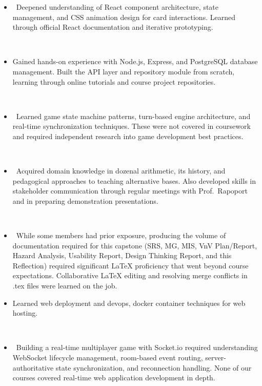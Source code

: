 \documentclass{article}
\begin{document}
\begin{itemize}
  \item  Deepened understanding of React component architecture, state management, and CSS animation design for card interactions. Learned through official React documentation and iterative prototyping.

  \item Gained hands-on experience with Node.js, Express, and PostgreSQL database management. Built the API layer and repository module from scratch, learning through online tutorials and course project repositories.

  \item  Learned game state machine patterns, turn-based engine architecture, and real-time synchronization techniques. These were not covered in coursework and required independent research into game development best practices.

  \item  Acquired domain knowledge in dozenal arithmetic, its history, and pedagogical approaches to teaching alternative bases. Also developed skills in stakeholder communication through regular meetings with Prof.\ Rapoport and in preparing demonstration presentations.

  \item  While some members had prior exposure, producing the volume of documentation required for this capstone (SRS, MG, MIS, VnV Plan/Report, Hazard Analysis, Usability Report, Design Thinking Report, and this Reflection) required significant LaTeX proficiency that went beyond course expectations. Collaborative LaTeX editing and resolving merge conflicts in .tex files were learned on the job.
  
  \item Learned web deployment and devops, docker container techniques for web hosting.

  \item  Building a real-time multiplayer game with Socket.io required understanding WebSocket lifecycle management, room-based event routing, server-authoritative state synchronization, and reconnection handling. None of our courses covered real-time web application development in depth.
\end{itemize}
\end{document}

